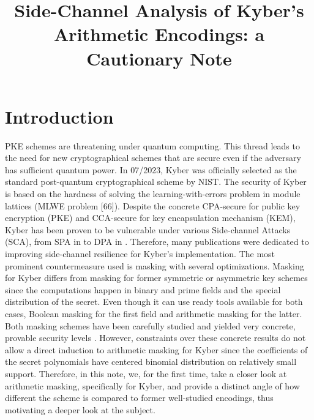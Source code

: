 \documentclass{llncs}
\begin{document}
 

\title{Side-Channel Analysis of Kyber's	Arithmetic Encodings: a Cautionary Note}
\maketitle

\begin{abstract}

\end{abstract}


\section{Introduction}
PKE schemes are threatening under quantum computing. This thread leads to the need for new cryptographical schemes that are secure even if the adversary has sufficient quantum power. In 07/2023, Kyber was officially selected as the standard post-quantum cryptographical scheme by NIST. The security of Kyber is based on the hardness of solving the learning-with-errors problem in module lattices
(MLWE problem [66]).
Despite the concrete CPA-secure for public key encryption (PKE) and CCA-secure for key encapsulation mechanism (KEM), Kyber has been proven to be vulnerable under various Side-channel Attacks (SCA), from SPA in  to DPA in . Therefore, many publications were dedicated to improving side-channel resilience for Kyber's implementation. The most prominent countermeasure used is masking with several optimizations.
Masking for Kyber differs from masking for former symmetric or asymmetric key schemes since the computations happen in binary and prime fields and the special distribution of the secret. Even though it can use ready tools available for both cases, Boolean masking for the first field and arithmetic masking for the latter. Both masking schemes have been carefully studied and yielded very concrete, provable security levels .
However, constraints over these concrete results do not allow a direct induction to arithmetic masking for Kyber since the coefficients of the secret polynomials have centered binomial distribution on relatively small support.
Therefore, in this note, we, for the first time, take a closer look at arithmetic masking, specifically for Kyber, and provide a distinct angle of how different the scheme is compared to former well-studied encodings, thus motivating a deeper look at the subject.
\end{document}
